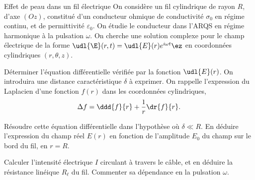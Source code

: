 \begin{exo}[PC][3][TD]{Effet de peau dans un fil électrique}
  On considère un fil cylindrique de rayon $R$, d'axe $(Oz)$, constitué d'un conducteur ohmique de conductivité $\sigma_0$ en régime continu, et de permittivité $\varepsilon_0$. On étudie le conducteur dans l'ARQS en régime harmonique à la pulsation $\omega$. On cherche une solution complexe pour le champ électrique de la forme $\udl{\E}(r,t) = \udl{E}(r) e^{i\omega t} \ez$ en coordonnées cylindriques $(r,\theta,z)$.
  \begin{quest}
    \item	Déterminer l'équation différentielle vérifiée par la fonction $\udl{E}(r)$. On introduira une distance caractéristique $\delta$ à exprimer. On rappelle l'expression du Laplacien d'une fonction $f(r)$ dans les coordonnées cylindriques,
    \begin{equation}
      \Delta f = \ddd{f}{r} + \frac{1}{r} \dr{f}{r}.
    \end{equation}
    \item Résoudre cette équation différentielle dans l'hypothèse où $\delta \ll R$. En déduire l'expression du champ réel $E(r)$ en fonction de l'amplitude $E_0$ du champ sur le bord du fil, en $r=R$.
    \item Calculer l'intensité électrique $I$ circulant à travers le câble, et en déduire la résistance linéique $R_\ell$ du fil. Commenter sa dépendance en la pulsation $\omega$.
  \end{quest}
\end{exo}



